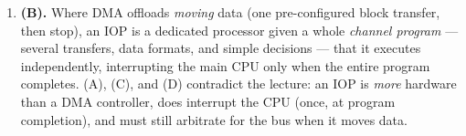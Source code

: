 \documentclass[11pt]{article}
\begin{document}
\begin{enumerate}
\item[\textbf{Q11}] \textbf{(B).} Where DMA offloads \emph{moving} data (one pre-configured block transfer, then stop), an IOP is a dedicated processor given a whole \emph{channel program} --- several transfers, data formats, and simple decisions --- that it executes independently, interrupting the main CPU only when the entire program completes. (A), (C), and (D) contradict the lecture: an IOP is \emph{more} hardware than a DMA controller, does interrupt the CPU (once, at program completion), and must still arbitrate for the bus when it moves data.
\end{enumerate}
\end{document}
